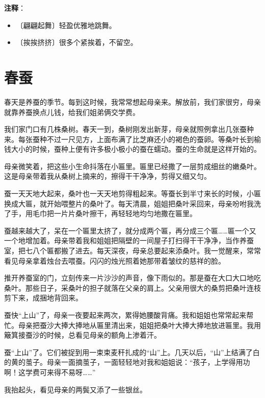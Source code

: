 \documentclass[12pt,UTF-8,openany]{ctexbook}
\begin{document}
\newpage

\textbf{注释}：

\vspace{-1em}

\begin{itemize}
    \setlength\itemsep{-0.2em}
    \item 〔翩翩起舞〕轻盈优雅地跳舞。
    \item 〔挨挨挤挤〕很多个紧挨着，不留空。
\end{itemize}

\chapter{春蚕}

\begin{large}
    
    春天是养蚕的季节。每到这时候，我常常想起母亲来。解放前，我们家很穷，母亲就靠养蚕换点儿钱，给我们姐弟俩交学费。
    
    我们家门口有几株桑树。春天一到，桑树刚发出新芽，母亲就照例拿出几张蚕种来。每张蚕种不过一尺见方，上面布满了比芝麻还小的褐色的蚕卵。等桑叶长到榆钱大小的时候，蚕种上便有许多极小极小的蚕在蠕动。蚕的生命就是这样开始的。
    
    母亲微笑着，把这些小生命抖落在小匾里。匾里已经撒了一层剪成细丝的嫩桑叶。这是母亲带着我从桑树上摘来的，擦得干干净净，剪得又细又匀。
    
    蚕一天天地大起来，桑叶也一天天地剪得粗起来。等蚕长到半寸来长的时候，小匾换成大匾，就开始喂整片的桑叶了。每天清晨，姐姐把桑叶采回来，母亲吩咐我洗了手，用毛巾把一片片桑叶擦干，再轻轻地均匀地撒在匾里。
    
    蚕越来越大了，呆在一个匾里太挤了，就分成两个匾，再分成三个匾……匾一个又一个地增加着。母亲带着我和姐姐把隔壁的一间屋子打扫得干干净净，当作养蚕室，把七八个匾都搬了进去。每天深夜，母亲总要起来添桑叶。我一觉醒来，常常看见母亲拿着烛台去喂蚕。闪闪的烛光照着她那带着皱纹的慈祥的脸。
    
    推开养蚕室的门，立刻传来一片沙沙的声音，像下雨似的。那是蚕在大口大口地吃桑叶。那些日子，采桑叶的担子就落在父亲的肩上。父亲用很大的桑剪把桑叶连枝剪下来，成捆地背回来。
    
    蚕快“上山”了，母亲一夜要起来两次，累得她腰酸背痛。我和姐姐也常常起来帮忙。母亲把蚕沙大捧大捧地从匾里清出来，姐姐把桑叶大捧大捧地放进匾里。我用簸箕接蚕沙的时候，总看见母亲的额角上渗着汗。
    
    蚕“上山”了。它们被捉到用一束束麦秆扎成的“山”上。几天以后，“山”上结满了白的黄的茧子。母亲一面摘茧子，一面轻轻地对我和姐姐说：“孩子，上学得用功啊！这学费可来得不易呀……”
    
    我抬起头，看见母亲的两鬓又添了一些银丝。
    
\end{large}
\end{document}
